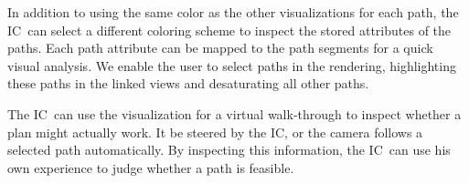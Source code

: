 \documentclass{egpubl}
\def\IC{IC}
\begin{document}
 In addition to using the same color as the other visualizations for each path, the \IC\ can select a different coloring scheme to inspect the stored attributes of the paths. Each path attribute can be mapped to the path segments for a quick visual analysis. We enable the user to select paths in the rendering, highlighting these paths in the linked views and desaturating all other paths.

The \IC\ can use the visualization for a virtual walk-through to inspect whether a plan might actually work. It be steered by the \IC , or the camera follows a selected path automatically. By inspecting this information, the \IC\ can use his own experience to judge whether a path is feasible.

\end{document}
